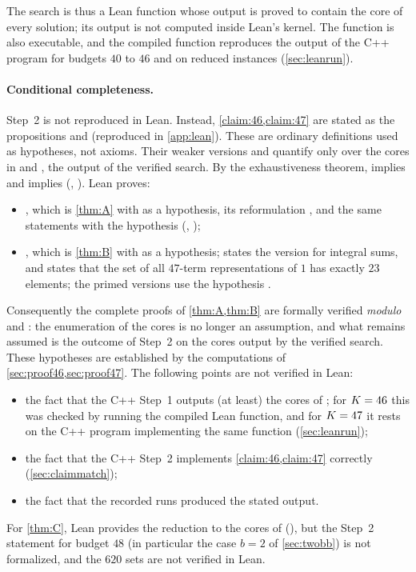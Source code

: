 \documentclass[11pt]{article}
\begin{document}
The search is thus a Lean function whose output is proved to contain the core of every solution; its output is not computed inside Lean's kernel. The function is also executable, and the compiled function reproduces the output of the C++ program for budgets $40$ to $46$ and on reduced instances (\cref{sec:leanrun}).

\paragraph{Conditional completeness.}
Step~2 is not reproduced in Lean. Instead, \cref{claim:46,claim:47} are stated as the propositions  and  (reproduced in \cref{app:lean}). These are ordinary definitions used as hypotheses, not axioms. Their weaker versions  and  quantify only over the cores in  and , the output of the verified search. By the exhaustiveness theorem,  implies  and  implies  (, ). Lean proves:
\begin{itemize}
\item {}, which is \cref{thm:A} with  as a hypothesis, its reformulation , and the same statements with the hypothesis  (, );
\item {}, which is \cref{thm:B} with  as a hypothesis;  states the version for integral sums, and  states that the set of all $47$-term representations of $1$ has exactly $23$ elements; the primed versions use the hypothesis .
\end{itemize}
Consequently the complete proofs of \cref{thm:A,thm:B} are formally verified \emph{modulo}  and : the enumeration of the cores is no longer an assumption, and what remains assumed is the outcome of Step~2 on the cores output by the verified search. These hypotheses are established by the computations of \cref{sec:proof46,sec:proof47}. The following points are not verified in Lean:
\begin{itemize}
\item the fact that the C++ Step~1 outputs (at least) the cores of ; for $K=46$ this was checked by running the compiled Lean function, and for $K=47$ it rests on the C++ program implementing the same function (\cref{sec:leanrun});
\item the fact that the C++ Step~2 implements \cref{claim:46,claim:47} correctly (\cref{sec:claimmatch});
\item the fact that the recorded runs produced the stated output.
\end{itemize}
For \cref{thm:C}, Lean provides the reduction to the cores of  (), but the Step~2 statement for budget $48$ (in particular the case $b=2$ of \cref{sec:twobb}) is not formalized, and the $620$ sets are not verified in Lean.
\end{document}
